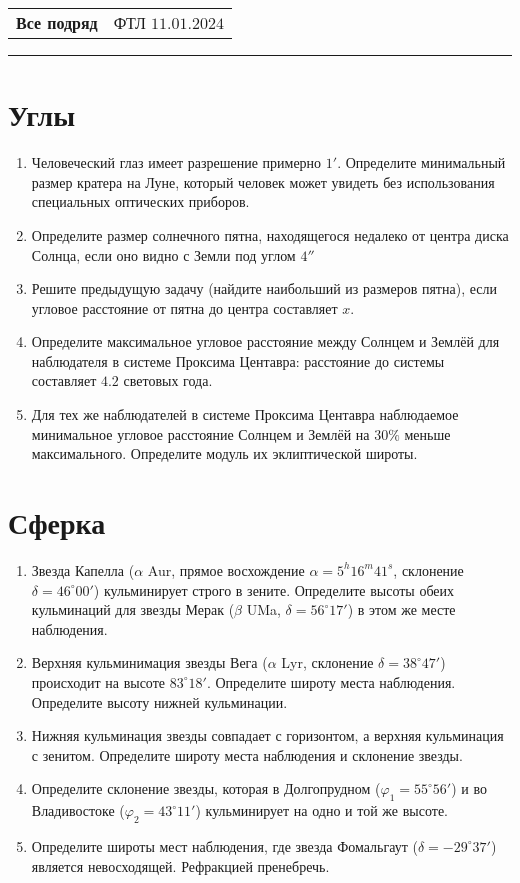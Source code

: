 \documentclass[12pt]{article}
\begin{document}
\begin{tabularx}{\textwidth}{Xr}
{\Large \textbf{Все подряд}} & ФТЛ $11.01.2024$ \\
\end{tabularx}
\noindent\rule{\textwidth}{0.4pt}
\section*{Углы}
\begin{enumerate}
    \item{Человеческий глаз имеет разрешение примерно $1'$. Определите минимальный размер кратера на Луне, который человек может увидеть без использования специальных оптических приборов.}
    \item{Определите размер солнечного пятна, находящегося недалеко от центра диска Солнца, если оно видно с Земли под углом $4''$}
    \item{Решите предыдущую задачу (найдите наибольший из размеров пятна), если угловое расстояние от пятна до центра составляет $x$.}
    \item{Определите максимальное угловое расстояние между Солнцем и Землёй для наблюдателя в системе Проксима Центавра: расстояние до системы составляет $4.2$ световых года.}
    \item{Для тех же наблюдателей в системе Проксима Центавра наблюдаемое минимальное угловое расстояние Солнцем и Землёй на $30\%$ меньше максимального. Определите модуль их эклиптической широты.}
\end{enumerate}
\section*{Сферка}
\begin{enumerate}[resume]
    \item Звезда Капелла ($\alpha$ Aur, прямое восхождение $\alpha=5^h 16^m 41^s$, склонение $\delta=46^{\circ}00'$) кульминирует строго в зените. Определите высоты обеих кульминаций для звезды Мерак ($\beta$ UMa, $\delta=56^{\circ}17'$) в этом же месте наблюдения.
    \item Верхняя кульминимация звезды Вега ($\alpha$ Lyr, склонение $\delta=38^{\circ} 47'$) происходит на высоте $83^{\circ}18'$. Определите широту места наблюдения. Определите высоту нижней кульминации.
    \item Нижняя кульминация звезды совпадает с горизонтом, а верхняя кульминация с зенитом. Определите широту места наблюдения и склонение звезды.
    \item Определите склонение звезды, которая в Долгопрудном ($\varphi_1 = 55^{\circ}56'$) и во Владивостоке ($\varphi_2 = 43^{\circ}11'$) кульминирует на одно и той же высоте.
    \item Определите широты мест наблюдения, где звезда Фомальгаут ($\delta = -29^{\circ}37'$) является невосходящей. Рефракцией пренебречь.
\end{enumerate}
\end{document}
